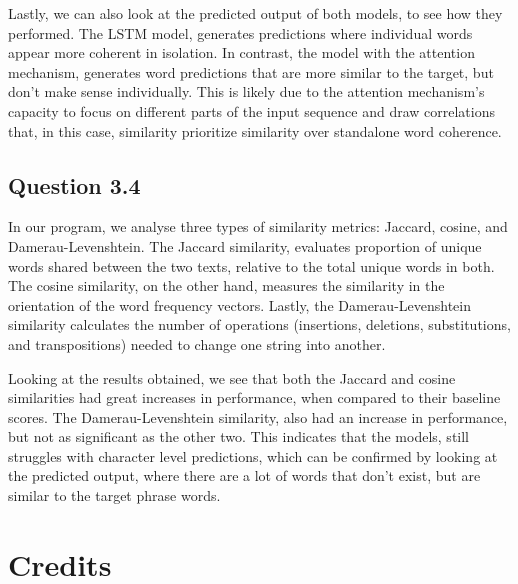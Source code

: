 \documentclass{article}
\begin{document}
Lastly, we can also look at the predicted output of both models, to see how they
performed. The LSTM model, generates predictions where individual words appear
more coherent in isolation. In contrast, the model with the attention mechanism,
generates word predictions that are more similar to the target, but don't make sense
individually. This is likely due to the attention mechanism's capacity to focus on 
different parts of the input sequence and draw correlations that, in this case,
similarity prioritize similarity over standalone word coherence.


\subsection{Question 3.4}
In our program, we analyse three types of similarity metrics: Jaccard, cosine, 
and Damerau-Levenshtein. The Jaccard similarity, evaluates proportion of unique words shared 
between the two texts, relative to the total unique words in both. The cosine similarity, on the other hand, measures  
the similarity in the orientation of the word frequency vectors. Lastly, the Damerau-Levenshtein 
similarity calculates the number of operations (insertions, deletions, substitutions, and transpositions) 
needed to change one string into another.

Looking at the results obtained, we see that both the Jaccard and cosine similarities
had great increases in performance, when compared to their baseline scores. The Damerau-Levenshtein 
similarity, also had an increase in performance, but not as significant as the other two. 
This indicates that the models, still struggles with character level predictions, which can be 
confirmed by looking at the predicted output, where there are a lot of words that don't exist, 
but are similar to the target phrase words. 


\section{Credits}
\end{document}
